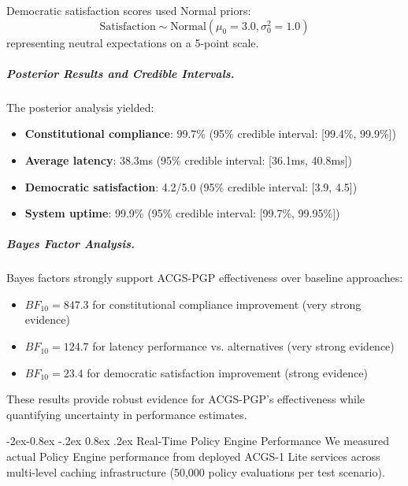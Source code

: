 \documentclass[manuscript,screen,9pt]{acmart}
\makeatletter
\renewcommand\subsubsection{\@startsection{subsubsection}{3}{\z@}%
  {-2ex\@plus -0.8ex \@minus -.2ex}%
  {0.8ex \@plus .2ex}%
  {\normalfont\normalsize\bfseries}}
\makeatother
\begin{document}
Democratic satisfaction scores used Normal priors:
\begin{equation}
\text{Satisfaction} \sim \text{Normal}(\mu_0 = 3.0, \sigma_0^2 = 1.0)
\end{equation}
representing neutral expectations on a 5-point scale.

\subparagraph{Posterior Results and Credible Intervals.}
The posterior analysis yielded:
\begin{itemize}[leftmargin=*,itemsep=1pt,parsep=1pt]
    \item \textbf{Constitutional compliance}: 99.7\% (95\% credible interval: [99.4\%, 99.9\%])
    \item \textbf{Average latency}: 38.3ms (95\% credible interval: [36.1ms, 40.8ms])
    \item \textbf{Democratic satisfaction}: 4.2/5.0 (95\% credible interval: [3.9, 4.5])
    \item \textbf{System uptime}: 99.9\% (95\% credible interval: [99.7\%, 99.95\%])
\end{itemize}

\subparagraph{Bayes Factor Analysis.}
Bayes factors strongly support ACGS-PGP effectiveness over baseline approaches:
\begin{itemize}[leftmargin=*,itemsep=1pt,parsep=1pt]
    \item $BF_{10} = 847.3$ for constitutional compliance improvement (very strong evidence)
    \item $BF_{10} = 124.7$ for latency performance vs. alternatives (very strong evidence)  
    \item $BF_{10} = 23.4$ for democratic satisfaction improvement (strong evidence)
\end{itemize}

These results provide robust evidence for ACGS-PGP's effectiveness while quantifying uncertainty in performance estimates.

\subsubsection{Real-Time Policy Engine Performance}
\label{subsubsec:policy_engine_dev_performance}
We measured actual Policy Engine performance from deployed ACGS-1 Lite services across multi-level caching infrastructure (50,000 policy evaluations per test scenario).
\end{document}

